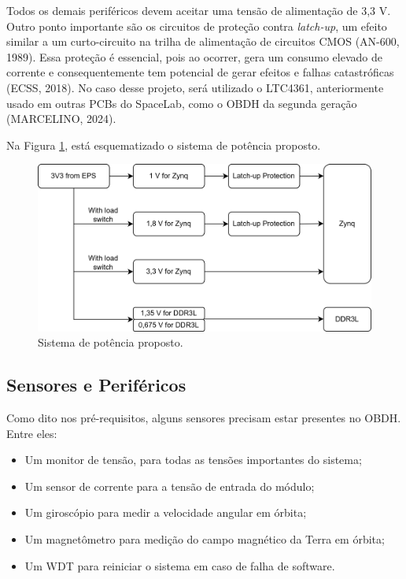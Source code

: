 Todos os demais periféricos devem aceitar uma tensão de alimentação de 3,3 V. Outro ponto importante são os circuitos de proteção contra \textit{latch-up}, um efeito similar a um curto-circuito na trilha de alimentação de circuitos CMOS (AN-600, 1989). Essa proteção é essencial, pois ao ocorrer, gera um consumo elevado de corrente e consequentemente tem potencial de gerar efeitos e falhas catastróficas (ECSS, 2018). No caso desse projeto, será utilizado o LTC4361, anteriormente usado em outras PCBs do SpaceLab, como o OBDH da  segunda geração (MARCELINO, 2024). 

Na Figura \ref{fig:diapower}, está esquematizado o sistema de potência proposto.

\begin{figure}[H]
    \centering
    \includegraphics[scale=1]{images/diapower.png}
    \caption{Sistema de potência proposto.}
    \label{fig:diapower}
\end{figure}

\subsection{Sensores e Periféricos}
Como dito nos pré-requisitos, alguns sensores precisam estar presentes no OBDH. Entre eles:

\begin{itemize}
	\item Um monitor de tensão, para todas as tensões importantes do sistema;
	\item Um sensor de corrente para a tensão de entrada do módulo;
	\item Um giroscópio para medir a velocidade angular em órbita;
	\item Um magnetômetro para medição do campo magnético da Terra em órbita;
	\item Um WDT para reiniciar o sistema em caso de falha de software.
\end{itemize}

